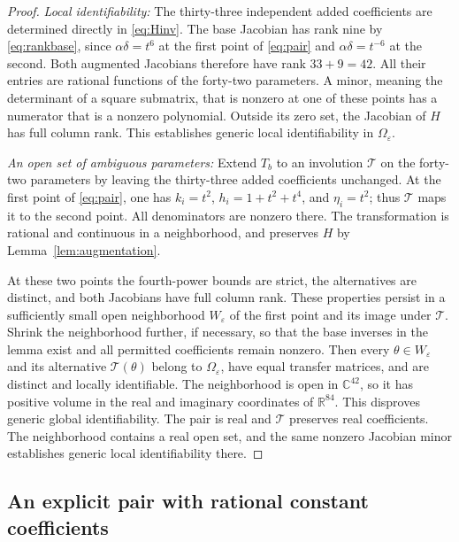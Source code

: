 \documentclass[letterpaper,10pt,conference]{ieeeconf}
\begin{document}
\begin{proof}
\emph{Local identifiability:}
The thirty-three independent added coefficients are determined directly
in \eqref{eq:Hinv}. The base Jacobian has rank nine by
\eqref{eq:rankbase}, since \(\alpha\delta=t^6\) at the first point of
\eqref{eq:pair} and \(\alpha\delta=t^{-6}\) at the second.
Both augmented Jacobians therefore have rank \(33+9=42\).
All their entries are rational functions of the forty-two parameters.
A minor, meaning the determinant of a square submatrix, that is
nonzero at one of these points has a numerator that is a
nonzero polynomial. Outside its zero set, the Jacobian of \(H\)
has full column rank. This establishes generic local identifiability
in \(\Omega_\varepsilon\).

\emph{An open set of ambiguous parameters:}
Extend \(T_b\) to an involution \(\mathcal T\) on the forty-two
parameters by leaving the
thirty-three added coefficients unchanged.
At the first point of \eqref{eq:pair}, one has \(k_i=t^2\),
\(h_i=1+t^2+t^4\), and \(\eta_i=t^2\); thus \(\mathcal T\) maps it to
the second point. All denominators are nonzero there.
The transformation is rational and continuous in a neighborhood, and
preserves \(H\) by Lemma~\ref{lem:augmentation}.

At these two points the fourth-power bounds are strict, the alternatives
are distinct, and both Jacobians have full column rank. These
properties persist in a sufficiently small open neighborhood
\(W_\varepsilon\) of the first point and its image under \(\mathcal T\).
Shrink the neighborhood further, if necessary, so that the base
inverses in the lemma exist and all permitted coefficients remain
nonzero. Then every
\(\theta\in W_\varepsilon\) and its alternative
\(\mathcal T(\theta)\) belong to \(\Omega_\varepsilon\), have equal
transfer matrices, and are distinct and locally identifiable.
The neighborhood is open in \(\mathbb C^{42}\), so it has positive
volume in the real and imaginary coordinates of \(\mathbb R^{84}\).
This disproves generic global identifiability.
The pair is real and \(\mathcal T\) preserves real coefficients.
The neighborhood contains a real open set, and the same nonzero
Jacobian minor establishes generic local identifiability there.
\end{proof}

\subsection{An explicit pair with rational constant coefficients}
\end{document}
